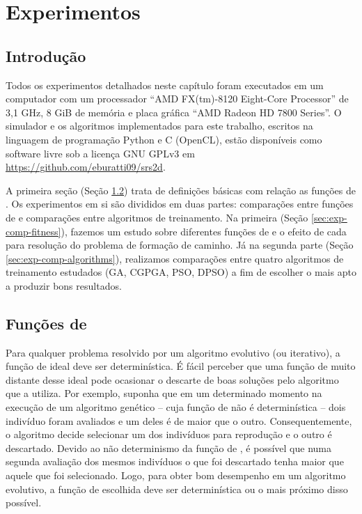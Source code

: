 \chapter{Experimentos}
\label{cha:experiments}

\section{Introdução}

Todos os experimentos detalhados neste capítulo foram executados em um computador com um processador ``AMD FX(tm)-8120 Eight-Core Processor'' de 3,1 GHz, 8 GiB de memória e placa gráfica ``AMD Radeon HD 7800 Series''. O simulador e os algoritmos implementados para este trabalho, escritos na linguagem de programação Python e C (OpenCL), estão disponíveis como software livre sob a licença GNU GPLv3 em \url{https://github.com/eburatti09/srs2d}.

A primeira seção (Seção \ref{sec:exp-fitness}) trata de definições básicas com relação as funções de \fitness. Os experimentos em si são divididos em duas partes: comparações entre funções de \fitness e comparações entre algoritmos de treinamento. Na primeira (Seção \ref{sec:exp-comp-fitness}), fazemos um estudo sobre diferentes funções de \fitness e o efeito de cada para resolução do problema de formação de caminho. Já na segunda parte (Seção \ref{sec:exp-comp-algorithms}), realizamos comparações entre quatro algoritmos de treinamento estudados (GA, CGPGA, PSO, DPSO) a fim de escolher o mais apto a produzir bons resultados.


\section{Funções de \fitness}
\label{sec:exp-fitness}

Para qualquer problema resolvido por um algoritmo evolutivo (ou iterativo), a função de \fitness ideal deve ser determinística. É fácil perceber que uma função de \fitness muito distante desse ideal pode ocasionar o descarte de boas soluções pelo algoritmo que a utiliza. Por exemplo, suponha que em um determinado momento na execução de um algoritmo genético -- cuja função de \fitness não é determinística -- dois indivíduo foram avaliados e um deles é de maior \fitness que o outro. Consequentemente, o algoritmo decide selecionar um dos indivíduos para reprodução e o outro é descartado. Devido ao não determinismo da função de \fitness, é possível que numa segunda avaliação dos mesmos indivíduos o que foi descartado tenha maior \fitness que aquele que foi selecionado. Logo, para obter bom desempenho em um algoritmo evolutivo, a função de \fitness escolhida deve ser determinística ou o mais próximo disso possível.

